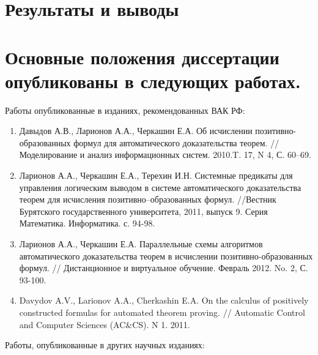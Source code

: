 \documentclass[a4paper]{report}
\begin{document}
\section*{Результаты и выводы}


\section*{Основные положения диссертации опубликованы в следующих работах.}

Работы опубликованные в изданиях, рекомендованных ВАК РФ:

\begin{enumerate}
\item Давыдов А.В., Ларионов А.А., Черкашин Е.А. Об исчислении
позитивно-образованных формул для автоматического доказательства
теорем. // Моделирование и анализ информационных систем. 2010.T. 17, N
4, С. 60--69.
\item Ларионов А.А., Черкашин Е.А., Терехин И.Н. Системные предикаты для
управления логическим выводом в системе автоматического доказательства
теорем для исчисления позитивно--образованных формул. //Вестник
Бурятского государственного университета, 2011, выпуск 9. Серия
Математика. Информатика. с. 94-98.
\item Ларионов А.А., Черкашин Е.А. Параллельные схемы алгоритмов
автоматического доказательства теорем в исчислении
позитивно-образованных формул. // Дистанционное и виртуальное
обучение. Февраль 2012. No. 2, С. 93-100.
\item Davydov A.V., Larionov A.A., Cherkashin E.A. On the calculus of
positively constructed formulas for automated theorem proving. //
Automatic Control and Computer Sciences (AC\&CS). N 1. 2011.
\end{enumerate}

Работы, опубликованные в других научных изданиях:
\end{document}
